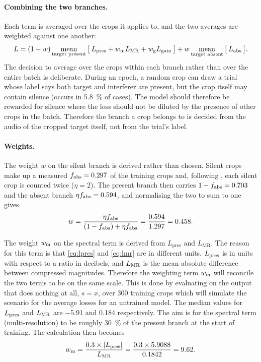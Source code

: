 \paragraph{Combining the two branches.}
Each term is averaged over the crops it applies to, and the two averages are
weighted against one another:
\begin{equation}
L = (1 - w) \operatorname*{mean}_{\textup{target present}}
      \big[\, L_\textup{pres} + w_\textup{m} L_\textup{MR} + w_\textup{g} L_\textup{gain} \,\big]
  + w \operatorname*{mean}_{\textup{target absent}}
      \big[\, L_\textup{abs} \,\big].
\label{eq:total}
\end{equation}
 The decision to average over the crops within each branch rather than over the entire batch is deliberate. During an epoch, a random crop can draw a trial whose label says both target and interferer are present, but the crop itself may contain silence (occurs in \SI{5.8}{\percent} of cases). The model should therefore be rewarded for silence where the loss should not be diluted by the presence of other crops in the batch. Therefore the branch a crop belongs to is decided from the audio of the cropped target itself, not from the trial's label.

\paragraph{Weights.} 

The weight $w$ on the silent branch is derived rather than chosen. Silent crops make up a measured $f_\textup{abs} = 0.297$ of the training crops and, following \cite{li2026cartse}, each silent crop is counted twice ($\eta = 2$). The present branch then carries $1 - f_\textup{abs} = 0.703$ and the absent branch $\eta f_\textup{abs} = 0.594$, and normalising the two to sum to one gives
  \begin{equation*}
  w = \frac{\eta f_\textup{abs}}{(1 - f_\textup{abs}) + \eta f_\textup{abs}} = \frac{0.594}{1.297} = 0.458 .
  \end{equation*}



The weight $w_\textup{m}$ on the spectral term is derived from $L_\text{pres}$ and $L_\text{MR}$. The reason for this term is that \eqref{eq:lpres} and \eqref{eq:lmr} are in different units. $L_\textup{pres}$ is in units with respect to a ratio in decibels, and $L_\textup{MR}$ is the mean absolute difference between compressed magnitudes. Therefore the weighting term $w_\textup{m}$ will reconcile the two terms to be on the same scale.
This is done by evaluating on the output that does nothing at all, $\hat{s} = x$, over 300 training crops which will simulate the scenario for the average losses for an untrained model. The median values for $L_\textup{pres}$ and $L_\textup{MR}$ are \num{-5.91} and \num{0.184} respectively. The aim is for the spectral term (multi-resolution) to be roughly \SI{30}{\percent} of the present branch at the start of training. The calculation then becomes  
\[
  w_\textup{m} = \frac{0.3 \times |L_\textup{pres}|}{L_\textup{MR}} = \frac{0.3 \times 5.9088}{0.1842} = 9.62.
\]


